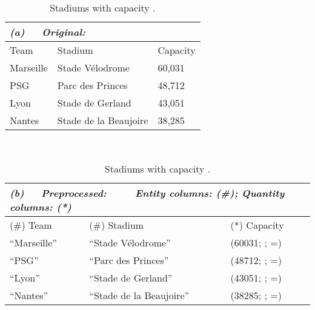 \begin{table}[t]
\caption[]{Stadiums with capacity \footnotemark. }

\centering
\small
\vspace{-1em}
\begin{tabular}{l|l|l} 
\multicolumn{3}{l}{\textit{(a)\ \ \ Original:}}\\
\hline
Team & Stadium & Capacity \\
\hline
 Marseille & Stade V\'elodrome & 60,031 \\
PSG & Parc des Princes & 48,712\\
Lyon &Stade de Gerland &43,051\\
Nantes&Stade de la Beaujoire &38,285\\
\hline
\end{tabular}
\label{fig:preprocess_sample_1}
\\
\centering
\small
\begin{tabular}{l|l|l} 
 \multicolumn{3}{l}{\textit{(b)\ \ \ Preprocessed:\ \ \ \ \ Entity columns: (\#); Quantity columns: (*)}}\\
\hline
(\#) Team & (\#) Stadium & (*) Capacity \\
\hline
``Marseille'' & ``Stade V\'elodrome'' & (60031; ; =) \\
``PSG'' & ``Parc des Princes'' & (48712; ; =)\\
``Lyon'' & ``Stade de Gerland'' &(43051; ; =)\\
``Nantes'' & ``Stade de la Beaujoire'' &(38285; ; =)\\
\hline
\end{tabular}
\end{table}

